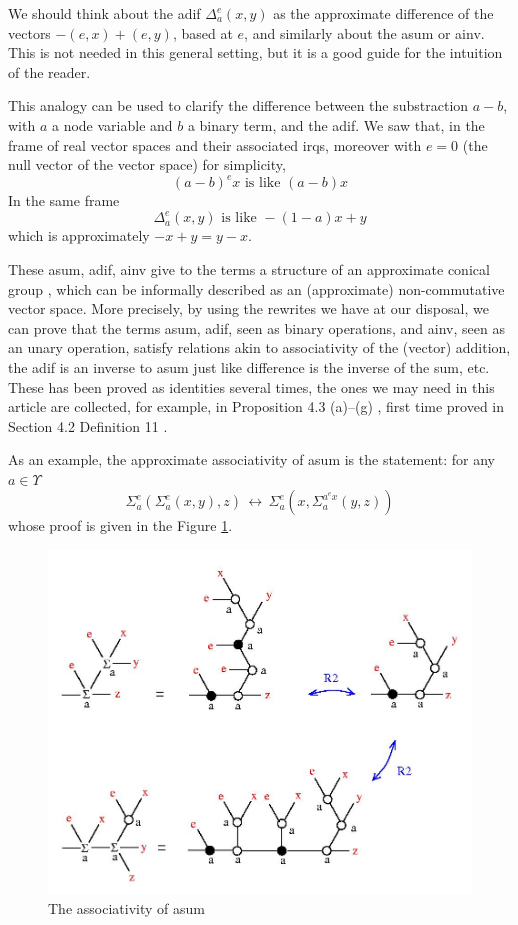 We should think about the adif $\displaystyle \Delta_{a}^{e}(x,y)$ as the approximate difference of the vectors $-(e,x)+(e,y)$, based at $e$, and similarly about the asum or ainv. This is not needed in this general setting, but it is a good guide for the intuition of the reader. 

This analogy can be used to clarify the difference between the substraction $a - b$, with $a$ a node variable and $b$ a binary term, and the adif. We saw that, in the frame of real vector spaces and their associated irqs,  moreover with $e=0$ (the null vector of the vector space) for simplicity, 
$$\displaystyle (a-b)^{e} x \mbox{  is like }   (a-b)x$$
 In the same frame  
$$\displaystyle \Delta_{a}^{e}(x,y) \mbox{ is like } -(1-a)x + y$$
which is approximately $\displaystyle -x+y = y-x$. 

These asum, adif, ainv give to the terms a structure of an approximate conical group \cite{buligainf}, which can be informally described as an (approximate) non-commutative vector space. 
More precisely, by using the rewrites we have at our disposal, we can prove that the terms asum, adif, seen as binary operations, and ainv, seen as an unary operation, satisfy relations akin to associativity of the (vector) addition, the adif is an inverse to asum just like difference is the inverse of the sum, etc. These has been proved as identities several times, the ones we may need in this article are collected, for example, in Proposition 4.3 (a)--(g) \cite{buligabraided}, first time proved in Section 4.2  Definition 11 \cite{buligadil1}. 

As an example, the approximate associativity of asum is the statement: for any $a \in \Upsilon$ 
$$ \Sigma_{a}^{e}\left( \Sigma_{a}^{e}\left(x,y\right), z\right) \, \longleftrightarrow \, \Sigma_{a}^{e}\left( x, \Sigma_{a}^{a^{e} x} \left( y,z\right)\right) $$
whose proof is given in the Figure \ref{sumassoc}. 
\begin{figure}[h]\centerline{\includegraphics[width=120mm]{jpg/sumassoc.jpg}}  \caption{ The associativity of asum } \label{sumassoc} \end{figure}
